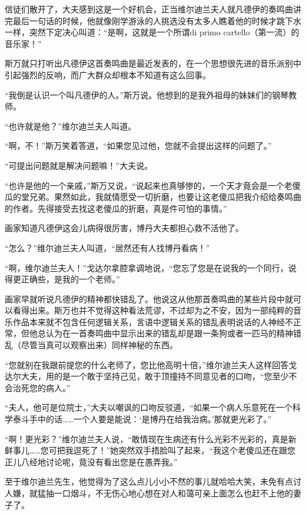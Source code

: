 \par 信徒们散开了，大夫感到这是一个好机会，正当维尔迪兰夫人就凡德伊的奏鸣曲讲完最后一句话的时候，他就像刚学游泳的人挑选没有太多人瞧着他的时候才跳下水一样，突然下定决心叫道：“是啊，这就是一个所谓di primo cartello（第一流）的音乐家！”
\par 斯万就只打听出凡德伊这首奏鸣曲是最近发表的，在一个思想很先进的音乐派别中引起强烈的反响，而广大群众却根本不知道有这么回事。
\par “我倒是认识一个叫凡德伊的人。”斯万说。他想到的是我外祖母的妹妹们的钢琴教师。
\par “也许就是他？”维尔迪兰夫人叫道。
\par “啊，不！”斯万笑着答道，“如果您见过他，您就不会提出这样的问题了。”
\par “可提出问题就是解决问题嘛！”大夫说。
\par “也许是他的一个亲戚，”斯万又说，“说起来也真够惨的，一个天才竟会是一个老傻瓜的堂兄弟。果然如此，我就情愿受一切折磨，也要让这老傻瓜把我介绍给奏鸣曲的作者。先得接受去找这老傻瓜的折磨，真是件可怕的事情。”
\par 画家知道凡德伊这会儿病得很厉害，博丹大夫都担心救不活他了。
\par “怎么？”维尔迪兰夫人叫道，“居然还有人找博丹看病！”
\par “啊，维尔迪兰夫人！”戈达尔拿腔拿调地说，“您忘了您是在说我的一个同行，说得更正确些，是我的一个老师。”
\par 画家早就听说凡德伊的精神都快错乱了。他说这从他那首奏鸣曲的某些片段中就可以看得出来。斯万也并不觉得这种看法荒谬，不过却为之不安，因为一部纯粹的音乐作品本来就不包含任何逻辑关系，言语中逻辑关系的错乱表明说话的人神经不正常，但他总认为在一首奏鸣曲中显示出来的错乱却是跟一条狗或者一匹马的精神错乱（尽管当真可以观察出来）同样神秘的东西。
\par “您就别在我跟前提您的什么老师了，您比他高明十倍，”维尔迪兰夫人这样回答戈达尔大夫，用的是一个敢于坚持己见，敢于顶撞持不同意见者的口吻，“您至少不会治死您的病人。”
\par “夫人，他可是位院士，”大夫以嘲讽的口吻反驳道，“如果一个病人乐意死在一个科学泰斗手中的话……一个人要是能说：‘是博丹在给我治病。’那就更光彩了。”
\par “啊！更光彩？”维尔迪兰夫人说，“敢情现在生病还有什么光彩不光彩的，真是新鲜事儿……您可把我逗死了！”她突然双手捂脸叫了起来，“我这个老傻瓜还在跟您正儿八经地讨论呢，竟没有看出您是在愚弄我。”
\par 至于维尔迪兰先生，他觉得为了这么点儿小小不然的事儿就哈哈大笑，未免有点讨人嫌，就猛抽一口烟斗，不无伤心地心想在对人和蔼可亲上面怎么也赶不上他的妻子了。
